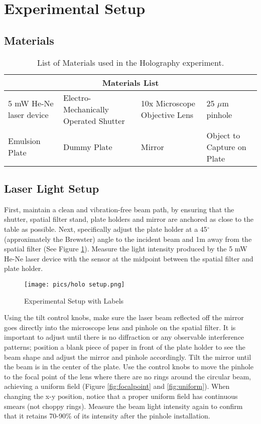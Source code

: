 \documentclass[12pt, letterpaper, twoside]{article}
\begin{document}
\section{Experimental Setup}

\subsection{Materials}

\begin{table}[!ht]
    \centering
        \begin{tabular}{|p{3.5cm}|p{4cm}|p{3cm}|p{3cm}|}
            \multicolumn{4}{c}{\textbf{Materials List}}\\
            \hline
            5 mW He-Ne laser device & Electro-Mechanically Operated Shutter & 10x Microscope Objective Lens & 25 $\mu$m pinhole  \\
            \hline
            Emulsion Plate & Dummy Plate & Mirror & Object to Capture on Plate \\
            \hline
        \end{tabular}
        \caption{List of Materials used in the Holography experiment.}
        \label{tab:my_label}
\end{table}

\subsection{Laser Light Setup}

First, maintain a clean and vibration-free beam path, by ensuring that the shutter, spatial filter stand, plate holders and mirror are anchored as close to the table as possible. Next, specifically adjust the plate holder at a 45$^{\circ}$ (approximately the Brewster) angle to the incident beam and 1m away from the spatial filter (See Figure \ref{fig:Setup}). Measure the light intensity produced by the 5 mW He-Ne laser device with the sensor at the midpoint between the spatial filter and plate holder. 

\begin{figure}[!ht]
    \centering
    \texttt{[image: pics/holo setup.png]}
    \caption{Experimental Setup with Labels}
    \label{fig:Setup}
\end{figure}

Using the tilt control knobs, make sure the laser beam reflected off the mirror goes directly into the microscope lens and pinhole on the spatial filter. It is important to adjust until there is no diffraction or any observable interference patterns; position a blank piece of paper in front of the plate holder to see the beam shape and adjust the mirror and pinhole accordingly. Tilt the mirror until the beam is in the center of the plate. Use the control knobs to move the pinhole to the focal point of the lens where there are no rings around the circular beam, achieving a uniform field (Figure \ref{fig:focalpoint} and \ref{fig:uniform}). When changing the x-y position, notice that a proper uniform field has continuous smears (not choppy rings). Measure the beam light intensity again to confirm that it retains 70-90\% of its intensity after the pinhole installation. 
\end{document}

